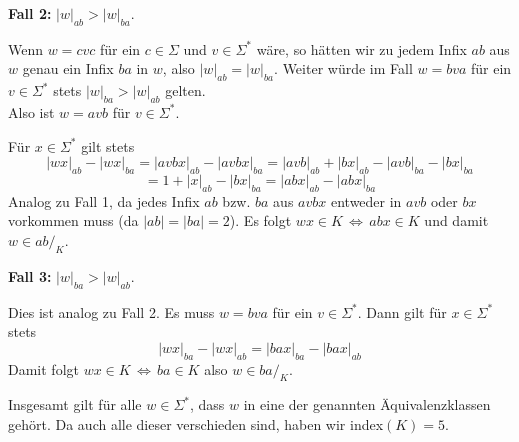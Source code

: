 \documentclass[a4paper,graphics,11pt]{article}
\begin{document}
\newpage

\textbf{Fall 2:} $|w|_{ab} > |w|_{ba}$.

Wenn $w = cvc$ für ein $c \in \Sigma$ und $v \in \Sigma^*$ wäre, so hätten
wir zu jedem Infix $ab$ aus $w$ genau ein Infix $ba$ in $w$, also $|w|_{ab} = |w|_{ba}$. Weiter würde
im Fall $w = bva$ für ein $v \in \Sigma^*$ stets $|w|_{ba} > |w|_{ab}$ gelten.\\
Also ist $w = avb$ für $v \in \Sigma^*$.

Für $x \in \Sigma^*$ gilt stets
$$
    |wx|_{ab} - |wx|_{ba} = |avbx|_{ab} - |avbx|_{ba} = |avb|_{ab} + |bx|_{ab} - |avb|_{ba} - |bx|_{ba}
$$$$
    = 1 + |x|_{ab} - |bx|_{ba}
    = |abx|_{ab} - |abx|_{ba}
$$
Analog zu Fall 1, da jedes Infix $ab$ bzw. $ba$ aus $avbx$ entweder in $avb$ oder $bx$ vorkommen muss (da
$|ab| = |ba| = 2$). Es folgt $wx \in K \,\Longleftrightarrow\, abx \in K$ und damit $w \in ab/_K$.

\textbf{Fall 3:} $|w|_{ba} > |w|_{ab}$.

Dies ist analog zu Fall 2. Es muss $w = bva$ für ein $v \in \Sigma^*$. Dann gilt für $x \in \Sigma^*$ stets
$$
    |wx|_{ba} - |wx|_{ab} = |bax|_{ba} - |bax|_{ab}
$$
Damit folgt $wx \in K \,\Longleftrightarrow\, ba \in K$ also $w \in ba/_K$.

Insgesamt gilt für alle $w \in \Sigma^*$, dass $w$ in eine der genannten Äquivalenzklassen gehört.
Da auch alle dieser verschieden sind, haben wir index$(K) = 5$.
\end{document}
